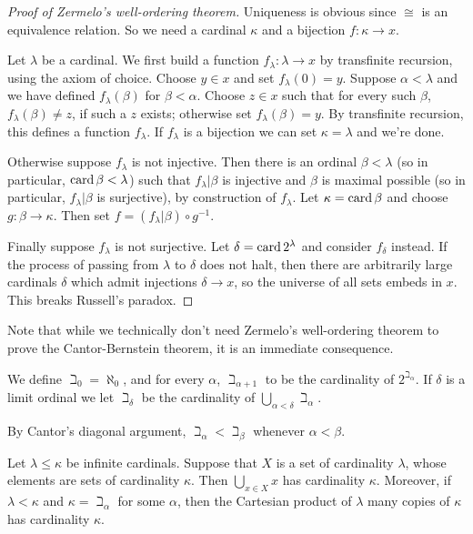 \begin{proof}[Proof of Zermelo's well-ordering theorem]
Uniqueness is obvious since $\cong$ is an equivalence relation.
So we need a cardinal $\kappa$ and a bijection $f: \kappa \to x$.

Let $\lambda$ be a cardinal. We first build a function $f_\lambda: \lambda \to x$ by transfinite recursion, using the axiom of choice.
Choose $y \in x$ and set $f_\lambda(0) = y$.
Suppose $\alpha < \lambda$ and we have defined $f_\lambda(\beta)$ for $\beta < \alpha$.
Choose $z \in x$ such that for every such $\beta$, $f_\lambda(\beta) \neq z$, if such a $z$ exists; otherwise set $f_\lambda(\beta) = y$.
By transfinite recursion, this defines a function $f_\lambda$. If $f_\lambda$ is a bijection we can set $\kappa = \lambda$ and we're done.

Otherwise suppose $f_\lambda$ is not injective. Then there is an ordinal $\beta < \lambda$ (so in particular, $\operatorname{card} \beta < \lambda$) such that $f_\lambda|\beta$ is injective and $\beta$ is maximal possible (so in particular, $f_\lambda|\beta$ is surjective), by construction of $f_\lambda$.
Let $\kappa = \operatorname{card} \beta$ and choose $g: \beta \to \kappa$.
Then set $f = (f_\lambda|\beta) \circ g^{-1}$.

Finally suppose $f_\lambda$ is not surjective. Let $\delta = \operatorname{card} 2^\lambda$ and consider $f_\delta$ instead.
If the process of passing from $\lambda$ to $\delta$ does not halt, then there are arbitrarily large cardinals $\delta$ which admit injections $\delta \to x$, so the universe of all sets embeds in $x$.
This breaks Russell's paradox.
\end{proof}

Note that while we technically don't need Zermelo's well-ordering theorem to prove the Cantor-Bernstein theorem, it is an immediate consequence.

\begin{definition}
\label{beth dfn}
We define $\beth_0 = \aleph_0$, and for every $\alpha$, $\beth_{\alpha + 1}$ to be the cardinality of $2^{\beth_\alpha}$.
If $\delta$ is a limit ordinal we let $\beth_\delta$ be the cardinality of $\bigcup_{\alpha < \delta} \beth_\alpha$.
\end{definition}

By Cantor's diagonal argument, $\beth_\alpha < \beth_\beta$ whenever $\alpha < \beta$.

\begin{theorem}
\label{cardinal arithmetic trivial}
Let $\lambda \leq \kappa$ be infinite cardinals.
Suppose that $X$ is a set of cardinality $\lambda$, whose elements are sets of cardinality $\kappa$. Then $\bigcup_{x \in X} x$ has cardinality $\kappa$.
Moreover, if $\lambda < \kappa$ and $\kappa = \beth_\alpha$ for some $\alpha$, then the Cartesian product of $\lambda$ many copies of $\kappa$ has cardinality $\kappa$.
\end{theorem}

